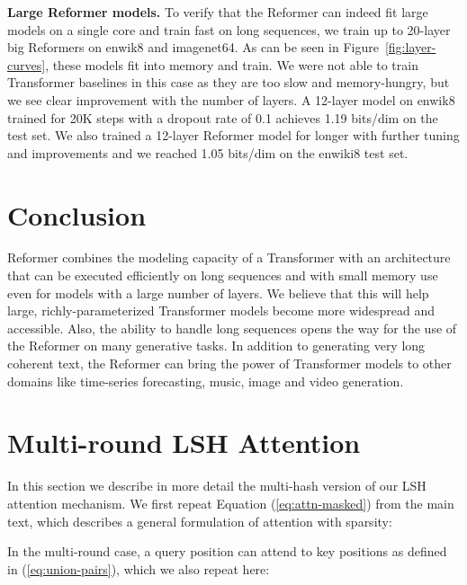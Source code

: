 \documentclass{article} \usepackage{iclr2020_conference,times}
\renewcommand{\paragraph}[1]{\textbf{#1}}
\begin{document}
\paragraph{Large Reformer models.} \label{sec:exp_large}
To verify that the Reformer can indeed fit large models on a single core
and train fast on long sequences, we train up to 20-layer big Reformers on enwik8 and imagenet64.
As can be seen in Figure~\ref{fig:layer-curves}, these models
fit into memory and train. We were not able to train Transformer baselines
in this case as they are too slow and memory-hungry, but we see clear improvement
with the number of layers. A 12-layer model on enwik8 trained for 20K steps with a dropout rate of 0.1 achieves 1.19 bits/dim on the test set. We also trained a 12-layer Reformer model for longer with
further tuning and improvements and we reached 1.05 bits/dim on the enwiki8 test
set.


\section{Conclusion}

Reformer combines the modeling capacity of a Transformer with an architecture that can be executed efficiently on long sequences and with small memory
use even for models with a large number of layers.
We believe that this will help large, richly-parameterized Transformer models become more widespread and accessible. 
Also, the ability to handle long sequences opens the way for the use of
the Reformer on many generative tasks. In addition to generating very long
coherent text, the Reformer can bring the power of Transformer models to other
domains like time-series forecasting, music, image and video generation.




\newpage
\appendix
\section{Multi-round LSH Attention} \label{sec:multi-round-detail}

In this section we describe in more detail the multi-hash version of our LSH attention mechanism. We first repeat Equation (\ref{eq:attn-masked}) from the main text, which describes a general formulation of attention with sparsity:


In the multi-round case, a query position  can attend to key positions  as defined in (\ref{eq:union-pairs}), which we also repeat here:
\end{document}
